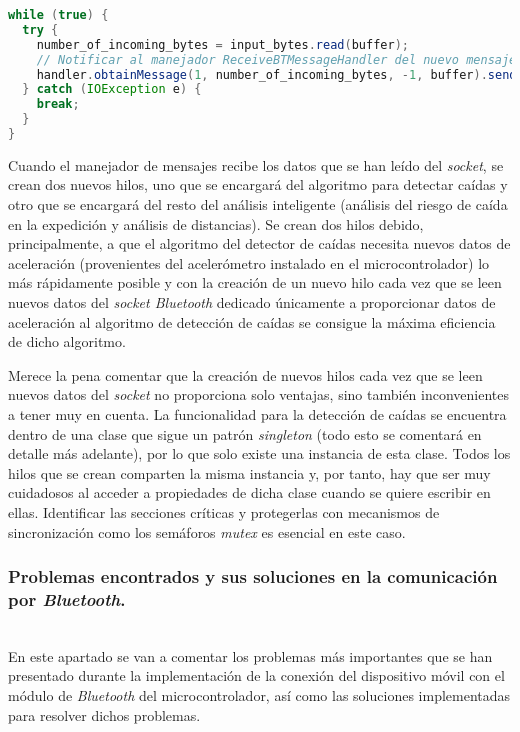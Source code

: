 \begin{lstlisting}[language=java,captionpos=t,caption={\textbf{Hilo secundario que lee datos del \textit{socket Bluetooth} y los envía a un manejador.}},label={lst:btthread}]
while (true) {
  try {
    number_of_incoming_bytes = input_bytes.read(buffer);
    // Notificar al manejador ReceiveBTMessageHandler del nuevo mensaje que se recibe
    handler.obtainMessage(1, number_of_incoming_bytes, -1, buffer).sendToTarget();
  } catch (IOException e) {
    break;
  }
}
\end{lstlisting}

Cuando el manejador de mensajes recibe los datos que se han leído del \textit{socket}, se crean dos nuevos hilos, uno que se encargará del algoritmo para detectar caídas y otro que se encargará del resto del análisis inteligente (análisis del riesgo de caída en la expedición y análisis de distancias). Se crean dos hilos debido, principalmente, a que el algoritmo del detector de caídas necesita nuevos datos de aceleración (provenientes del acelerómetro instalado en el microcontrolador) lo más rápidamente posible y con la creación de un nuevo hilo cada vez que se leen nuevos datos del \textit{socket Bluetooth} dedicado únicamente a proporcionar datos de aceleración al algoritmo de detección de caídas se consigue la máxima eficiencia de dicho algoritmo. 

Merece la pena comentar que la creación de nuevos hilos cada vez que se leen nuevos datos del \textit{socket} no proporciona solo ventajas, sino también inconvenientes a tener muy en cuenta. La funcionalidad para la detección de caídas se encuentra dentro de una clase que sigue un patrón \textit{singleton} (todo esto se comentará en detalle más adelante), por lo que solo existe una instancia de esta clase. Todos los hilos que se crean comparten la misma instancia y, por tanto, hay que ser muy cuidadosos al acceder a propiedades de dicha clase cuando se quiere escribir en ellas. Identificar las secciones críticas y protegerlas con mecanismos de sincronización como los semáforos \textit{mutex} es esencial en este caso.

\subsubsection{Problemas encontrados y sus soluciones en la comunicación por \textit{Bluetooth}.}

\\

En este apartado se van a comentar los problemas más importantes que se han presentado durante la implementación de la conexión del dispositivo móvil con el módulo de \textit{Bluetooth} del microcontrolador, así como las soluciones implementadas para resolver dichos problemas.

